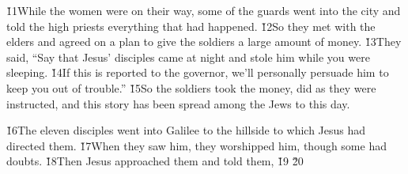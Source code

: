 \v{11}While the women were on their way, some of the guards went into the city and told the high priests everything that had happened. \v{12}So they met with the elders and agreed on a plan to give the soldiers a large amount of money. \v{13}They said, ``Say that Jesus' disciples came at night and stole him while you were sleeping. \v{14}If this is reported to the governor, we'll personally persuade him to keep you out of trouble.'' \v{15}So the soldiers took the money, did as they were instructed, and this story has been spread among the Jews to this day.

\v{16}The eleven disciples went into Galilee to the hillside to which Jesus had directed them. \v{17}When they saw him, they worshipped him, though some had doubts. \v{18}Then Jesus approached them and told them,  \v{19} \v{20} 

